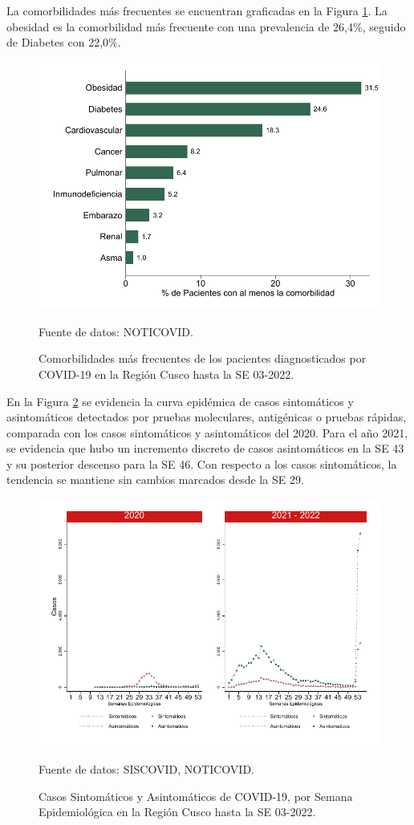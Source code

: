 \documentclass[12pt,a4paper,openany]{book}
\begin{document}
La comorbilidades más frecuentes se encuentran graficadas en la Figura \ref{fig:comorbilidades}. La obesidad es la comorbilidad más frecuente con una prevalencia de 26,4$\%$, seguido de Diabetes con 22,0$\%$. 
\begin{figure}[h]
	\caption{Comorbilidades más frecuentes de los pacientes diagnosticados por COVID-19 en la Región Cusco hasta la SE 03-2022. }\label{fig:comorbilidades}
	\begin{center}
		\includegraphics[width=0.65\linewidth]{../figuras/figura_comorbilidad.pdf}
	\end{center}
	{\footnotesize {Fuente de datos: NOTICOVID.}}
\end{figure}
\clearpage
 En la Figura \ref{fig:sintomaticos_asintomati} se evidencia la curva epidémica de casos sintomáticos y asintomáticos detectados por pruebas moleculares, antigénicas o pruebas rápidas, comparada con los casos sintomáticos y asintomáticos del 2020. Para el año 2021, se evidencia que hubo un incremento discreto de casos asintomáticos en la SE 43 y su posterior descenso para la SE 46. Con respecto a los casos sintomáticos, la tendencia se mantiene sin cambios marcados desde la SE 29. 
 
 
\begin{figure}[h]
	\caption{Casos Sintomáticos y Asintomáticos de COVID-19, por Semana Epidemiológica en la Región Cusco hasta la SE 03-2022.  }\label{fig:sintomaticos_asintomati}
	
	\begin{center}
		\includegraphics[width=0.75\linewidth]{../figuras/sintomaticos_20_21.pdf}
	\end{center}
	{\footnotesize {Fuente de datos: SISCOVID, NOTICOVID.}}
\end{figure}
\clearpage
\end{document}
